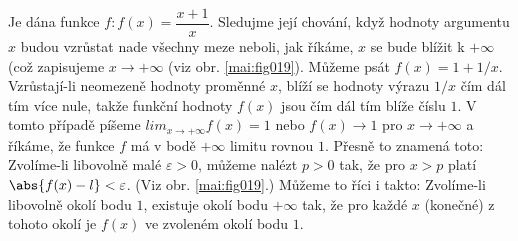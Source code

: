 \begin{mdframed}[style=mdexam]
  \begin{example}\label{MAI:exam030}
    Je dána funkce \(f: f(x) = \dfrac{x + 1}{x}\). Sledujme její chování, když hodnoty argumentu
    \(x\) budou vzrůstat nade všechny meze neboli, jak říkáme, \(x\) se bude blížit k \(+\infty\)
    (což zapisujeme \(x \to + \infty\) (viz obr. \ref{mai:fig019}). Můžeme psát \(f(x) = 1 + 1/x\).
    Vzrůstají-li neomezeně hodnoty proměnné \(x\), blíží se hodnoty výrazu \(1/x\) čím dál tím více
    nule, takže funkční hodnoty \(f(x)\) jsou čím dál tím blíže číslu \(1\). V tomto případě píšeme
    \(lim_{x\to+\infty} f(x) = 1\) nebo \(f(x) \to 1\) pro \(x\to +\infty\) a říkáme, že funkce
    \(f\) má v bodě \(+\infty\) limitu rovnou \(1\). Přesně to znamená toto: Zvolíme-li libovolně
    malé \(\varepsilon > 0\), můžeme nalézt \(p > 0\) tak, že pro \(x > p\) platí \(\abs{f(x) - l} <
    \varepsilon\). (Viz obr. \ref{mai:fig019}.) Můžeme to říci i takto: Zvolíme-li libovolně okolí
    bodu \(1\), existuje okolí bodu \(+\infty\) tak, že pro každé \(x\) (konečné) z tohoto okolí je
    \(f(x)\) ve zvoleném okolí bodu \(1\).
    
    {\centering
    \captionsetup{type=figure}
    \par}
  \end{example}
\end{mdframed}















